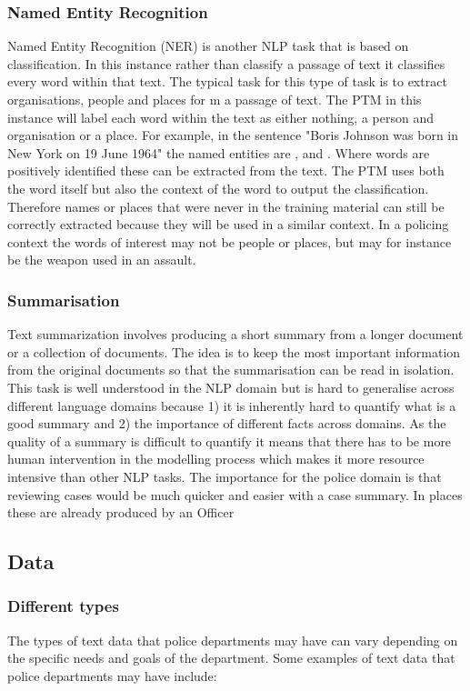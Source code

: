\subsubsection{Named Entity Recognition} Named Entity Recognition (NER) is another NLP task that is based on classification. In this instance rather than classify a passage of text it classifies every word within that text. The typical task for this type of task is to extract organisations, people and places for m a passage of text. The PTM in this instance will label each word within the text as either nothing, a person and organisation or a place. For example, in the sentence "Boris Johnson was born in New York on 19 June 1964" the named entities are ,  and . Where words are positively identified these can be extracted from the text. The PTM uses both the word itself but also the context of the word to output the classification. Therefore names or places that were never in the training material can still be correctly extracted because they will be used in a similar context. In a policing context the words of interest may not be people or places, but may for instance be the weapon used in an assault.


\subsubsection{Summarisation} Text summarization involves producing a short summary from a longer document or a collection of documents. The idea is to keep the most important information from the original documents so that the summarisation can be read in isolation. This task is well understood in the NLP domain but is hard to generalise across different language domains because 1) it is inherently hard to quantify what is a good summary and 2) the importance of different facts across domains. As the quality of a summary is difficult to quantify it means that there has to be more human intervention in the modelling process which makes it more resource intensive than other NLP tasks. The importance for the police domain is that reviewing cases would be much quicker and easier with a case summary. In places these are already produced by an Officer 


\subsection{Data}
\subsubsection{Different types} The types of text data that police departments may have can vary depending on the specific needs and goals of the department. Some examples of text data that police departments may have include:

